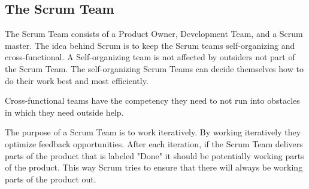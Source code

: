 \subsection{The Scrum Team}


The Scrum Team consists of a Product Owner, Development Team, and a Scrum master\cite{scrumguide11}. The idea behind Scrum is to keep the Scrum teams self-organizing and cross-functional. A Self-organizing team is not affected by outsiders not part of the Scrum Team\cite{scrumguide11}. The self-organizing Scrum Teams can decide themselves how to do their work best and most efficiently\cite{scrumguide11}. 

Cross-functional teams have the competency they need to not run into obstacles in which they need outside help\cite{scrumguide11}.


The purpose of a Scrum Team is to work iteratively\cite{scrumguide11}. By working iteratively they optimize feedback opportunities\cite{scrumguide11}. After each iteration, if the Scrum Team delivers parts of the product that is labeled "Done" it should be potentially working parts of the product\cite{scrumguide11}. This way Scrum tries to ensure that there will always be working parts of the product out\cite{scrumguide11}.



